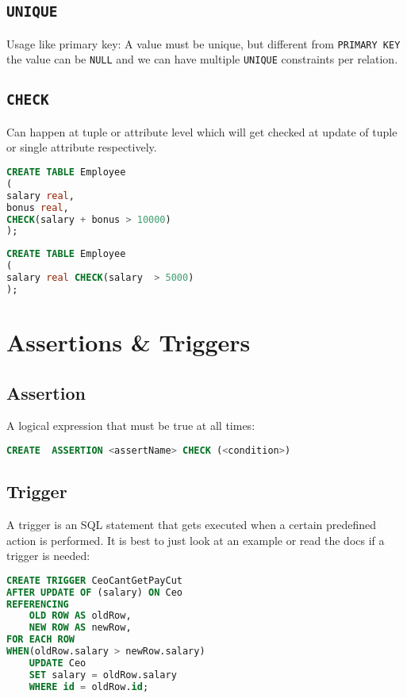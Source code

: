 \documentclass{article}
\renewcommand{\t}[1]{\texttt{#1}}
\begin{document}
\subsection*{\t{UNIQUE}}
Usage like primary key: A value must be unique, but different from \t{PRIMARY KEY} the value can be \t{NULL} and we can have multiple \t{UNIQUE} constraints per relation.

\subsection*{\t{CHECK}}
Can happen at tuple or attribute level which will get checked at update of tuple or single attribute respectively.
\begin{lstlisting}[language=SQL]
CREATE TABLE Employee
(
salary real,
bonus real,
CHECK(salary + bonus > 10000)
);
\end{lstlisting}

\begin{lstlisting}[language=SQL]
CREATE TABLE Employee
(
salary real CHECK(salary  > 5000)
);
\end{lstlisting}


\section*{Assertions \& Triggers}

\subsection*{Assertion}
A logical expression that must be true at all times:
\begin{lstlisting}[language=SQL]
CREATE  ASSERTION <assertName> CHECK (<condition>)
\end{lstlisting}

\subsection*{Trigger}
A trigger is an SQL statement that gets executed when a certain predefined action is performed. It is best to just look at an example or read the docs if a trigger is needed:

\begin{lstlisting}[language=SQL]
CREATE TRIGGER CeoCantGetPayCut
AFTER UPDATE OF (salary) ON Ceo
REFERENCING
	OLD ROW AS oldRow,
	NEW ROW AS newRow,
FOR EACH ROW
WHEN(oldRow.salary > newRow.salary)
	UPDATE Ceo
	SET salary = oldRow.salary
	WHERE id = oldRow.id;
\end{lstlisting}
\end{document}

